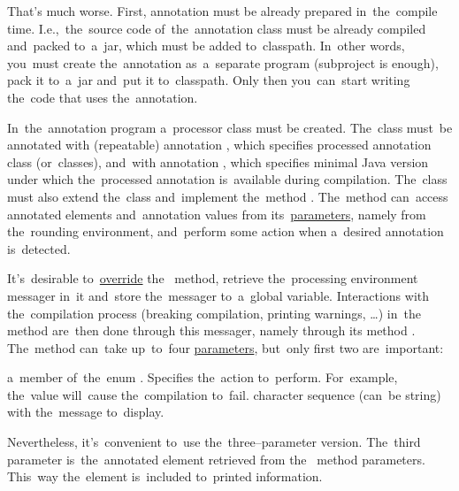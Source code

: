 
That's much worse.
First, annotation must be already prepared in~the~compile time.
I.e.,~the~source code of~the~annotation class must be already compiled and~packed to~a~jar, which must be added to~classpath.
In~other words, you~must create the~annotation as~a~separate program (subproject is enough), pack it to~a~jar and~put it to~classpath.
Only then you~can~start writing the~code that uses the~annotation.

In~the~annotation program a~processor class must be created.
The~class must~be annotated with (repeatable) annotation , which specifies processed annotation class (or~classes), and~with annotation , which specifies minimal Java version under which the~processed annotation is~available during compilation.
The~class must also extend the~class  and~implement the~method .
The~method can~access annotated elements and~annotation values from its~\hyperref[parameterargument]{parameters}, namely from the~rounding environment, and~perform some action when a~desired annotation is~detected.

It's~desirable to~\hyperref[javaoverride]{override} the~ method, retrieve the~processing environment messager in~it and~store the~messager to~a~global variable.
Interactions with the~compilation process (breaking compilation, printing warnings, \dots) in~the~ method are~then done through this messager, namely through its method .
The~method can~take up~to~four \hyperref[parameterargument]{parameters}, but~only first two are~important:
\begin{itemize}
     a~member of~the~enum .
             Specifies the~action to~perform.
             For~example, the~value  will~cause the~compilation to~fail.
     character sequence (can~be string) with the~message to~display.
\end{itemize}
\noindent Nevertheless, it's~convenient to~use the~three--parameter version.
The~third parameter is~the~annotated element retrieved from the~ method parameters.
This~way the~element is~included to~printed information.

